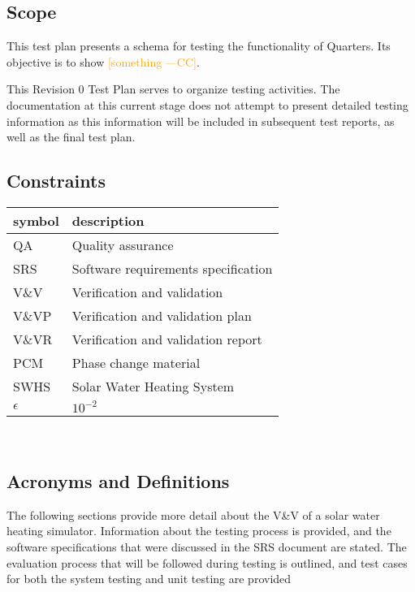 \documentclass[12pt]{article}
\newcommand{\authornote}[3]{\textcolor{#1}{[#3 ---#2]}}
\newcommand{\authornote}[3]{}
\newcommand{\cc}[1]{\authornote{orange}{CC}{#1}}
\begin{document}
\subsection{Scope}
This test plan presents a schema for testing the functionality of Quarters. Its objective is to show \cc{something}. 

This Revision 0 Test Plan serves to organize testing activities. The documentation at this current stage does not attempt to present detailed testing information as this information will be included in subsequent test reports, as well as the final test plan.

\subsection{Constraints}

\renewcommand{\arraystretch}{1.2}
\begin{tabular}{l l} 
  \toprule		
  \textbf{symbol} & \textbf{description}\\
  \midrule 
  QA		&Quality assurance\\
  SRS		&Software requirements specification\\
  V\&V		& Verification and validation\\
  V\&VP 	& Verification and validation plan\\
  V\&VR 	& Verification and validation report\\
  PCM		& Phase change material\\
  SWHS		& Solar Water Heating System\\
  $\epsilon$& $10^{-2}$\\
  \bottomrule
\end{tabular}\\

\subsection{Acronyms and Definitions}
The following sections provide more detail about the V\&V of a solar water heating
 simulator. Information about the testing process is provided, and the software specifications
that were discussed in the SRS document are stated.  The evaluation process that will be followed during 
testing is outlined, and test cases for both the system testing and unit testing are provided 

%
%
\end{document}
